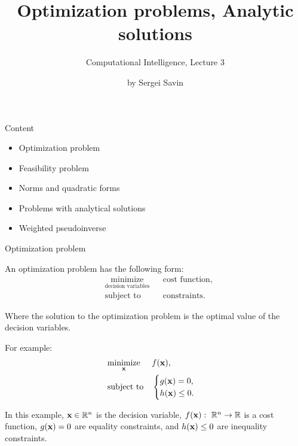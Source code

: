 \documentclass{beamer}
\title{Optimization problems, Analytic solutions}
\subtitle{Computational Intelligence, Lecture 3}
\author{by Sergei Savin}
\date{\mydate}
\begin{document}
\maketitle


\begin{frame}{Content}

\begin{itemize}
\item Optimization problem
\item Feasibility problem
\item Norms and quadratic forms
\item Problems with analytical solutions
\item Weighted pseudoinverse
\end{itemize}

\end{frame}




\begin{frame}{Optimization problem}
	\begin{flushleft}
		
		An optimization problem has the following form:
		\begin{equation}
			\begin{aligned}
				& \underset{\text{decision variables}}{\text{minimize}}
				& & \text{cost function}, \\
				& \text{subject to}
				& & \text{constraints}.
			\end{aligned}
		\end{equation}
	
		Where the solution to the optimization problem is the optimal value of the decision variables.
		
		\bigskip
		
		For example:
		\begin{equation}
			\begin{aligned}
				& \underset{\mathbf{x}}{\text{minimize}}
				& & f(\mathbf{x}), \\
				& \text{subject to}
				& & \begin{cases}
					g(\mathbf{x}) = 0, \\
					h(\mathbf{x}) \leq 0.
				\end{cases}
			\end{aligned}
		\end{equation}
	
	In this example, $\mathbf{x} \in \mathbb{R}^n$ is the decision variable, $f(\mathbf{x}): \ \mathbb{R}^n \rightarrow \mathbb{R}$ is a cost function, $g(\mathbf{x}) = 0$ are equality constraints, and $h(\mathbf{x}) \leq 0$ are inequality constraints.

	\end{flushleft}
\end{frame}
\end{document}
